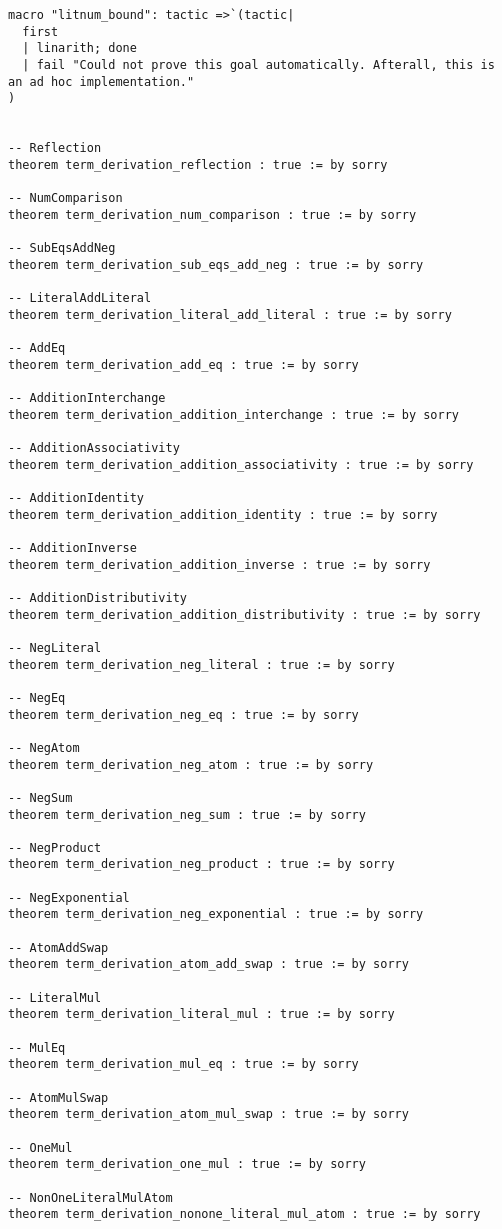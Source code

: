 \documentclass{article}
\begin{document}
\begin{tcolorbox}[colback=white!10, width=\linewidth]
\begin{lstlisting}[language=Lean4]
macro "litnum_bound": tactic =>`(tactic|
  first
  | linarith; done
  | fail "Could not prove this goal automatically. Afterall, this is an ad hoc implementation."
)


-- Reflection
theorem term_derivation_reflection : true := by sorry

-- NumComparison
theorem term_derivation_num_comparison : true := by sorry

-- SubEqsAddNeg
theorem term_derivation_sub_eqs_add_neg : true := by sorry

-- LiteralAddLiteral
theorem term_derivation_literal_add_literal : true := by sorry

-- AddEq
theorem term_derivation_add_eq : true := by sorry

-- AdditionInterchange
theorem term_derivation_addition_interchange : true := by sorry

-- AdditionAssociativity
theorem term_derivation_addition_associativity : true := by sorry

-- AdditionIdentity
theorem term_derivation_addition_identity : true := by sorry

-- AdditionInverse
theorem term_derivation_addition_inverse : true := by sorry

-- AdditionDistributivity
theorem term_derivation_addition_distributivity : true := by sorry

-- NegLiteral
theorem term_derivation_neg_literal : true := by sorry

-- NegEq
theorem term_derivation_neg_eq : true := by sorry

-- NegAtom
theorem term_derivation_neg_atom : true := by sorry

-- NegSum
theorem term_derivation_neg_sum : true := by sorry

-- NegProduct
theorem term_derivation_neg_product : true := by sorry

-- NegExponential
theorem term_derivation_neg_exponential : true := by sorry

-- AtomAddSwap
theorem term_derivation_atom_add_swap : true := by sorry

-- LiteralMul
theorem term_derivation_literal_mul : true := by sorry

-- MulEq
theorem term_derivation_mul_eq : true := by sorry

-- AtomMulSwap
theorem term_derivation_atom_mul_swap : true := by sorry

-- OneMul
theorem term_derivation_one_mul : true := by sorry

-- NonOneLiteralMulAtom
theorem term_derivation_nonone_literal_mul_atom : true := by sorry


\end{lstlisting}
\end{tcolorbox}
\end{document}
